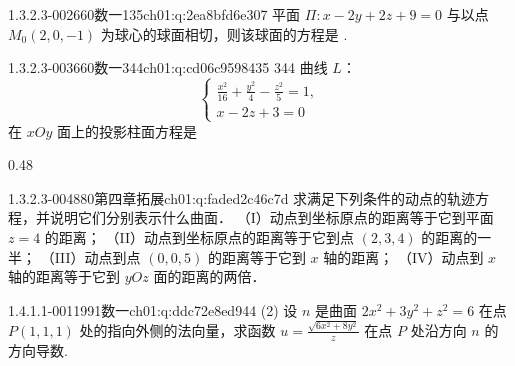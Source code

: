 \begin{q}{1.3.2.3-002}{660数一135}{ch01:q:2ea8bfd6e307}
平面 $\Pi:x-2y+2z+9=0$ 与以点 $M_0(2,0,-1)$ 为球心的球面相切，则该球面的方程是 \underline{\hspace{4em}}.
\end{q}

\begin{q}{1.3.2.3-003}{660数一344}{ch01:q:cd06c9598435}
344 曲线 $L$：\[\begin{cases}\frac{x^2}{16}+\frac{y^2}{4}-\frac{z^2}{5}=1,\\ x-2z+3=0\end{cases}\] 在 $xOy$ 面上的投影柱面方程是
\begin{opts}{0.48}
\hfill{}\\[0.3ex]
\hfill{}
\end{opts}
\end{q}

\begin{q}{1.3.2.3-004}{880第四章拓展}{ch01:q:faded2c46c7d}
求满足下列条件的动点的轨迹方程，并说明它们分别表示什么曲面．
（I）动点到坐标原点的距离等于它到平面 $z=4$ 的距离；
（II）动点到坐标原点的距离等于它到点 $(2,3,4)$ 的距离的一半；
（III）动点到点 $(0,0,5)$ 的距离等于它到 $x$ 轴的距离；
（IV）动点到 $x$ 轴的距离等于它到 $yOz$ 面的距离的两倍．
\end{q}

\par\addvspace{2.4ex}\noindent
\begin{minipage}{\linewidth}



\begin{q}{1.4.1.1-001}{1991数一}{ch01:q:ddc72e8ed944}
(2) 设 $n$ 是曲面 $2x^2+3y^2+z^2=6$ 在点 $P(1,1,1)$ 处的指向外侧的法向量，求函数 $u=\frac{\sqrt{6x^2+8y^2}}{z}$ 在点 $P$ 处沿方向 $n$ 的方向导数.
\end{q}
\end{minipage}


